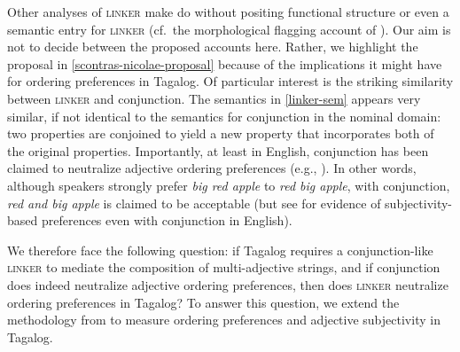 \documentclass[12pt,letterpaper]{article}
\begin{document}
Other analyses of \textsc{linker} make do without positing functional structure or even a semantic entry for \textsc{linker} (cf.~the morphological flagging account of \citealp{chungladusaw2004}). Our aim is not to decide between the proposed accounts here. Rather, we highlight the proposal in \ref{scontras-nicolae-proposal} because of the implications it might have for ordering preferences in Tagalog. Of particular interest is the striking similarity between \textsc{linker} and conjunction. The semantics in \ref{linker-sem} appears very similar, if not identical to the semantics for conjunction in the nominal domain: two properties are conjoined to yield a new property that incorporates both of the original properties. Importantly, at least in English, conjunction has been claimed to neutralize adjective ordering preferences (e.g., \citealp{fordolson1975,byrne1979}). In other words, although speakers strongly prefer \emph{big red apple} to \emph{red big apple}, with conjunction, \emph{red and big apple} is claimed to be acceptable (but see \citealp{rosalesscontras2019} for  evidence of subjectivity-based preferences even with conjunction in English).

We therefore face the following question: if Tagalog requires a conjunction-like \textsc{linker} to mediate the composition of multi-adjective strings, and if conjunction does indeed neutralize adjective ordering preferences, then does \textsc{linker} neutralize ordering preferences in Tagalog? To answer this question, we extend the methodology from \cite{scontrasetal2017adjectives} to measure ordering preferences and adjective subjectivity in Tagalog.


\end{document}
